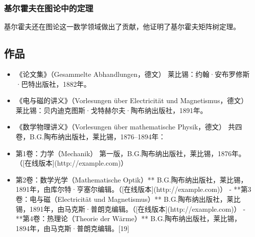 \subsubsection{基尔霍夫在图论中的定理} 
基尔霍夫还在图论这一数学领域做出了贡献，他证明了基尔霍夫矩阵树定理。
\subsection{作品} 
\begin{itemize}
\item 《论文集》（Gesammelte Abhandlungen，德文）  
  莱比锡：约翰·安布罗修斯·巴特出版社，1882年。  
\item 《电与磁的讲义》（Vorlesungen über Electricität und Magnetismus，德文） 
  莱比锡：贝内迪克图斯·戈特赫尔夫·陶布纳出版社，1891年。  
\item 《数学物理讲义》（Vorlesungen über mathematische Physik，德文）
  共四卷，B.G.陶布纳出版社，莱比锡，1876–1894年：
\end{itemize}  
\begin{itemize}
\item 第1卷：力学（Mechanik）  
    第一版，B.G.陶布纳出版社，莱比锡，1876年。（[在线版本](http://example.com)）  
\item 第2卷：数学光学（Mathematische Optik）**  
    B.G.陶布纳出版社，莱比锡，1891年，由库尔特·亨塞尔编辑。（[在线版本](http://example.com)）  
  - **第3卷：电与磁（Electricität und Magnetismus）**  
    B.G.陶布纳出版社，莱比锡，1891年，由马克斯·普朗克编辑。（[在线版本](http://example.com)）  
  - **第4卷：热理论（Theorie der Wärme）**  
    B.G.陶布纳出版社，莱比锡，1894年，由马克斯·普朗克编辑。[19]
\end{itemize}
